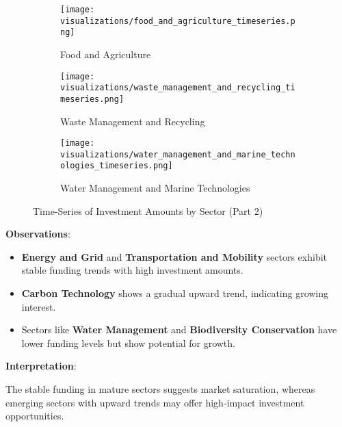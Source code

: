 \documentclass[sigconf]{acmart}
\begin{document}
\begin{figure*}[htpb]
    \centering
    \begin{subfigure}[t]{0.32\textwidth}
        \texttt{[image: visualizations/food\_and\_agriculture\_timeseries.png]}
        \caption{Food and Agriculture}
    \end{subfigure}
    \hfill
    \begin{subfigure}[t]{0.32\textwidth}
        \texttt{[image: visualizations/waste\_management\_and\_recycling\_timeseries.png]}
        \caption{Waste Management and Recycling}
    \end{subfigure}
    \hfill
    \begin{subfigure}[t]{0.32\textwidth}
        \texttt{[image: visualizations/water\_management\_and\_marine\_technologies\_timeseries.png]}
        \caption{Water Management and Marine Technologies}
    \end{subfigure}
    \caption{Time-Series of Investment Amounts by Sector (Part 2)}
    \label{fig:sector_timeseries2}
\end{figure*}

\textbf{Observations}:

\begin{itemize}
    \item \textbf{Energy and Grid} and \textbf{Transportation and Mobility} sectors exhibit stable funding trends with high investment amounts.
    \item \textbf{Carbon Technology} shows a gradual upward trend, indicating growing interest.
    \item Sectors like \textbf{Water Management} and \textbf{Biodiversity Conservation} have lower funding levels but show potential for growth.
\end{itemize}

\textbf{Interpretation}:

The stable funding in mature sectors suggests market saturation, whereas emerging sectors with upward trends may offer high-impact investment opportunities.
\end{document}
